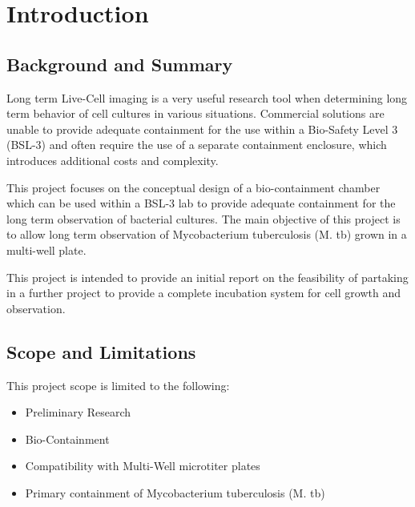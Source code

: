 \documentclass[class=report,11pt,crop=false]{standalone}
\begin{document}
\chapter{Introduction} \label{ch:introduction}
\vspace{-1cm}

\section{Background and Summary}
Long term Live-Cell imaging is a very useful research tool when determining long term behavior of cell cultures in various situations. Commercial solutions are unable to provide adequate containment for the use within a Bio-Safety Level 3 (BSL-3) and often require the use of a separate containment enclosure, which introduces additional costs and complexity.


This project focuses on the conceptual design of a bio-containment chamber which can be used within a BSL-3 lab to provide adequate containment for the long term observation of bacterial cultures. The main objective of this project is to allow long term observation of Mycobacterium tuberculosis (M. tb) grown in a multi-well plate.

This project is intended to provide an initial report on the feasibility of partaking in a further project to provide a complete incubation system for cell growth and observation.  

\section{Scope and Limitations}
This project scope is limited to the following:
\begin{itemize}
	\item Preliminary Research
	\item Bio-Containment
	\item Compatibility with Multi-Well microtiter plates
	\item Primary containment of Mycobacterium tuberculosis (M. tb)
\end{itemize}
\end{document}
